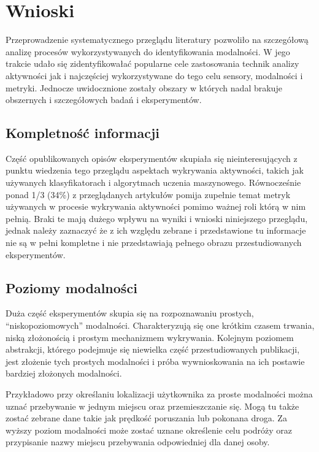 \section{Wnioski}
Przeprowadzenie systematycznego przeglądu literatury pozwoliło na szczegółową analizę procesów wykorzystywanych do identyfikowania modalności. W jego trakcie udało się zidentyfikowałać popularne cele zastosowania technik analizy aktywności jak i najczęściej wykorzystywane do tego celu sensory, modalności i metryki. Jednocze uwidocznione zostały obszary w których nadal brakuje obszernych i szczegółowych badań i eksperymentów.

\subsection{Kompletność informacji}
Część opublikowanych opisów eksperymentów skupiała się nieinteresujących z punktu wiedzenia tego przeglądu aspektach wykrywania aktywności, takich jak używanych klasyfikatorach i algorytmach uczenia maszynowego. Równocześnie ponad 1/3 (34\%) z przeglądanych artykułów pomija zupełnie temat metryk używanych w procesie wykrywania aktywności pomimo ważnej roli którą w nim pełnią. Braki te mają dużego wpływu na wyniki i wnioski niniejszego przeglądu, jednak należy zaznaczyć że z ich względu zebrane i przedstawione tu informacje nie są w pełni kompletne i nie przedstawiają pełnego obrazu przestudiowanych eksperymentów. 

\subsection{Poziomy modalności}
\label{sec:modality_levels}
Duża część eksperymentów skupia się na rozpoznawaniu prostych, ``niskopoziomowych'' modalności. Charakteryzują się one krótkim czasem trwania, niską złożonością i prostym mechanizmem wykrywania. Kolejnym poziomem abstrakcji, którego podejmuje się niewielka część przestudiowanych publikacji, jest złożenie tych prostych modalności i próba wywnioskowania na ich postawie bardziej złożonych modalności.

Przykładowo przy określaniu lokalizacji użytkownika za proste modalności można uznać przebywanie w jednym miejscu oraz przemieszczanie się. Mogą tu także zostać zebrane dane takie jak prędkość poruszania lub pokonana droga. Za wyższy poziom modalności może zostać uznane określenie celu podróży oraz przypisanie  nazwy miejscu przebywania odpowiedniej dla danej osoby.

